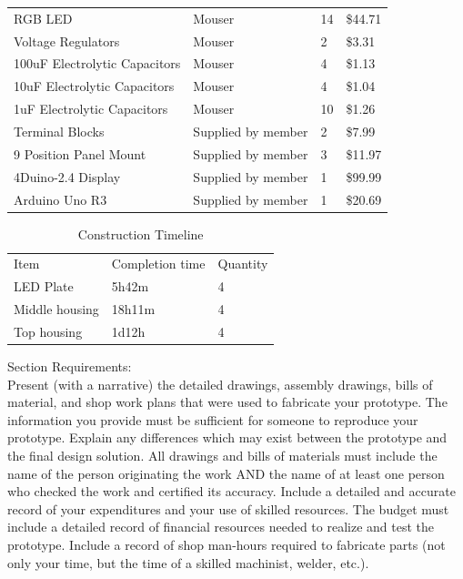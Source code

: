 \documentclass[12pt,a4paper]{report}
\begin{document}
\begin{table}[H]
\begin{center}
\begin{tabular}{llll}
RGB LED                       & Mouser          & 14       & \$44.71  \\
Voltage Regulators            & Mouser          & 2        & \$3.31   \\
100uF Electrolytic Capacitors & Mouser          & 4        & \$1.13   \\
10uF Electrolytic Capacitors  & Mouser          & 4        & \$1.04   \\
1uF Electrolytic Capacitors   & Mouser          & 10       & \$1.26   \\
Terminal Blocks               & Supplied by member        & 2        & \$7.99   \\
9 Position Panel Mount        & Supplied by member        & 3        & \$11.97  \\
4Duino-2.4 Display            & Supplied by member        & 1        & \$99.99  \\
Arduino Uno R3                & Supplied by member        & 1        & \$20.69 
\end{tabular}
\end{center}
\end{table}
\thispagestyle{empty}

\begin{table}[H]
\caption {Construction Timeline}
\label{tab:title}
\begin{center}
\begin{tabular}{lll}
Item          & Completion time & Quantity \\
LED Plate     & 5h42m           & 4        \\
Middle housing & 18h11m          & 4        \\
Top housing   & 1d12h           & 4       
\end{tabular}
\end{center}
\end{table}

Section Requirements:\\
Present (with a narrative) the detailed drawings, assembly drawings, bills of material, and shop work plans that were used to fabricate your prototype.  The information you provide must be sufficient for someone to reproduce your prototype.  Explain any differences which may exist between the prototype and the final design solution.
All drawings and bills of materials must include the name of the person originating the work AND the name of at least one person who checked the work and certified its accuracy.
Include a detailed and accurate record of your expenditures and your use of skilled resources.  The budget must include a detailed record of financial resources needed to realize and test the prototype.  Include a record of shop man-hours required to fabricate parts (not only your time, but the time of a skilled machinist, welder, etc.).
\end{document}
